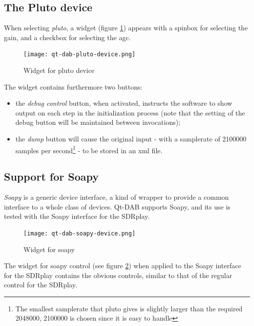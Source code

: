 \documentclass[12pt]{article}
\begin{document}
\subsection{The Pluto device}
When selecting {\em pluto}, a widget (figure \ref{figure:plutocontrol})
appears with a spinbox for selecting
the gain, and a checkbox for selecting the agc.
\begin{figure}[htp]
\centering
\texttt{[image: qt-dab-pluto-device.png]}
\caption{Widget for pluto device}
\label{figure:plutocontrol}
\end{figure}
The widget contains furthermore two buttons:
\begin{itemize}
\item the {\em debug control} button, when activated, instructs the software
to show output on each step in the initialization process (note that the
setting of the debug button will be maintained between invocations);
\item the {\em dump} button will cause the original input - with a samplerate
of 2100000 samples per second\footnote{The smallest samplerate that pluto
gives is slightly larger than the required 2048000, 2100000 is chosen
since it is easy to handle} - to be stored in an xml file.
\end{itemize}
\subsection{Support for Soapy}
{\em Soapy} is a generic device interface, a kind of wrapper to provide
a common interface to a whole class of devices. 
Qt-DAB supports Soapy, and its use is tested with the Soapy interface
for the SDRplay.

\begin{figure}[htp]
\centering
\texttt{[image: qt-dab-soapy-device.png]}
\caption{Widget for soapy}
\label{figure:soapycontrol}
\end{figure}

The widget for soapy control (see figure \ref{figure:soapycontrol}) 
when applied to the Soapy interface for the SDRplay contains the obvious
controls, similar to that of the regular control for the SDRplay.
\end{document}
